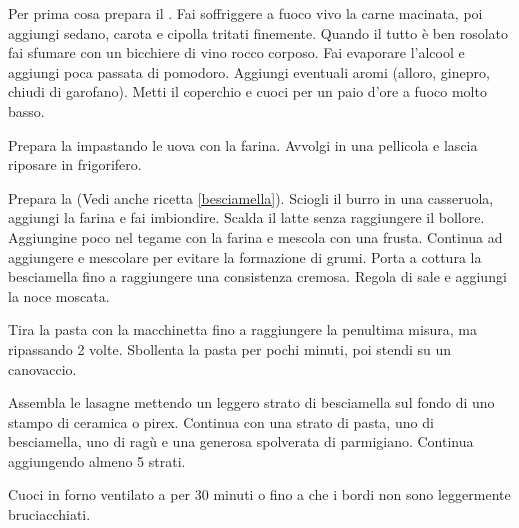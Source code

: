 \begin{method}
Per prima cosa prepara il . Fai soffriggere a fuoco vivo la carne macinata, poi aggiungi sedano, carota e cipolla tritati finemente. Quando il tutto è ben rosolato fai sfumare con un bicchiere di vino rocco corposo. Fai evaporare l'alcool e aggiungi poca passata di pomodoro. Aggiungi eventuali aromi (alloro, ginepro, chiudi di garofano). Metti il coperchio e cuoci per un paio d'ore a fuoco molto basso.

Prepara la  impastando le uova con la farina. Avvolgi in una pellicola e lascia riposare in frigorifero.

Prepara la  (Vedi anche ricetta \ref{besciamella}). Sciogli il burro in una casseruola, aggiungi la farina e fai imbiondire. Scalda il latte senza raggiungere il bollore. Aggiungine poco nel tegame con la farina e mescola con una frusta. Continua ad aggiungere e mescolare per evitare la formazione di grumi. Porta a cottura la besciamella fino a raggiungere una consistenza cremosa. Regola di sale e aggiungi la noce moscata.

Tira la pasta con la macchinetta fino a raggiungere la penultima misura, ma ripassando 2 volte. Sbollenta la pasta per pochi minuti, poi stendi su un canovaccio.

Assembla le lasagne mettendo un leggero strato di besciamella sul fondo di uno stampo di ceramica o pirex. Continua con una strato di pasta, uno di besciamella, uno di ragù e una generosa spolverata di parmigiano. Continua aggiungendo almeno 5 strati.

Cuoci in forno ventilato a  per 30 minuti o fino a che i bordi non sono leggermente bruciacchiati.


\end{method}




